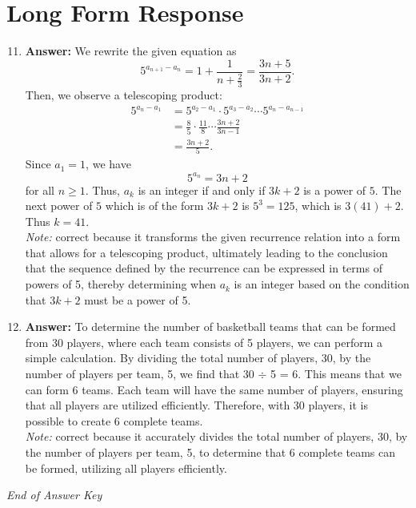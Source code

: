 \documentclass[12pt]{article}
\begin{document}
\section*{Long Form Response}
\begin{enumerate}[label=\arabic*.]
\setcounter{enumi}{10}
\item \textbf{Answer:} We rewrite the given equation as \[5^{a_{n+1} - a_n} = 1 + \frac{1}{n +\frac{2}{3}} = \frac{3 n+5}{3 n+2}.\]Then, we observe a telescoping product: \[\begin{aligned} 5^{a_n - a_1} &= 5^{a_2 - a_1} \cdot 5^{a_3-a_2} \cdots 5^{a_n - a_{n-1}} \\ &= \frac{8}{5} \cdot \frac{11}{8} \cdots \frac{3 n+2}{3 n-1} \\ &= \frac{3 n+2}{5}. \end{aligned}\]Since $a_1 = 1$, we have \[5^{a_n} = 3 n+2\]for all $n \ge 1$. Thus, $a_k$ is an integer if and only if $3 k+2$ is a power of $5$. The next power of $5$ which is of the form $3 k+2$ is $5^3 = 125$, which is $3(41) + 2$. Thus $k = \boxed{41}$.
\\ \textit{Note:} correct because it transforms the given recurrence relation into a form that allows for a telescoping product, ultimately leading to the conclusion that the sequence defined by the recurrence can be expressed in terms of powers of 5, thereby determining when \( a_k \) is an integer based on the condition that \( 3 k + 2 \) must be a power of 5.
\item \textbf{Answer:} To determine the number of basketball teams that can be formed from 30 players, where each team consists of 5 players, we can perform a simple calculation. By dividing the total number of players, 30, by the number of players per team, 5, we find that 30 \ensuremath{\div} 5 = 6. This means that we can form 6 teams. Each team will have the same number of players, ensuring that all players are utilized efficiently. Therefore, with 30 players, it is possible to create 6 complete teams.
\\ \textit{Note:} correct because it accurately divides the total number of players, 30, by the number of players per team, 5, to determine that 6 complete teams can be formed, utilizing all players efficiently.
\end{enumerate}

\vfill
\noindent\textit{End of Answer Key}
\end{document}

